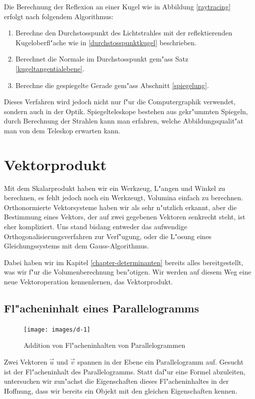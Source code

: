 Die Berechnung der Reflexion an einer Kugel wie in Abbildung \ref{raytracing}
erfolgt nach folgendem Algorithmus:
\begin{enumerate}
\item Berechne den Durchstosspunkt des Lichtstrahles mit der reflektierenden
Kugeloberfl"ache wie in \ref{durchstosspunktkugel} beschrieben.  
\item Berechnet die Normale im Durchstosspunkt gem"ass Satz \ref{kugeltangentialebene}.
\item Berechne die gespiegelte Gerade gem"ass Abschnitt \ref{spiegelung}.
\end{enumerate}
Dieses Verfahren wird jedoch nicht nur f"ur die Computergraphik verwendet,
sondern auch in der Optik. Spiegelteleskope bestehen aus gekr"ummten Spiegeln,
durch Berechnung der Strahlen kann man erfahren, welche Abbildungsqualit"at
man von dem Teleskop erwarten kann.

\section{Vektorprodukt}
Mit dem Skalarprodukt haben wir ein Werkzeug, L"angen und Winkel zu berechnen,
es fehlt jedoch noch ein Werkzeugt, Volumina einfach zu berechnen. Orthonormierte
Vektorsysteme haben wir als sehr n"utzlich erkannt, aber die Bestimmung eines
Vektors, der auf zwei gegebenen Vektoren senkrecht steht, ist eher kompliziert.
Uns stand bislang entweder das
aufwendige Orthogonalisierungsverfahren zur Verf"ugung, oder die L"osung
eines Gleichungssystems mit dem Gauss-Algorithmus.

Dabei haben wir im Kapitel \ref{chapter-determinanten} bereits alles
bereitgestellt,
was wir f"ur die Volumenberechnung ben"otigen. Wir werden auf diesem
Weg eine neue Vektoroperation kennenlernen, das Vektorprodukt.

\subsection{Fl"acheninhalt eines Parallelogramms}
\begin{figure}
\begin{center}
\texttt{[image: images/d-1]}
\end{center}
\caption{Addition von Fl"acheninhalten von Parallelogrammen 
\label{image-flaeche-addition}}
\end{figure}
Zwei Vektoren $\vec u$ und $\vec v$ spannen in der Ebene ein Parallelogramm
auf. Gesucht ist der Fl"acheninhalt des Parallelogramms. Statt daf"ur eine
Formel abzuleiten, untersuchen wir zun"achst die Eigenschaften dieses
Fl"acheninhaltes in der Hoffnung, dass wir bereits ein Objekt mit den
gleichen Eigenschaften kennen.


